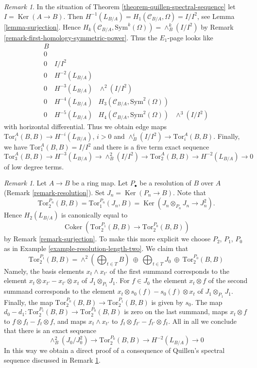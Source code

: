 \documentclass[10pt,a4paper]{article}
\theoremstyle{plain}
\theoremstyle{definition}
\theoremstyle{remark}
\newtheorem{remark}[subsection]{Remark}
\numberwithin{equation}{subsection}
\def\Ker{\mathop{\mathrm{Ker}}}
\def\Coker{\mathop{\mathrm{Coker}}}
\begin{document}
\begin{remark}
\label{remark-elucidate-ss}
In the situation of Theorem \ref{theorem-quillen-spectral-sequence}
let $I = \Ker(A \to B)$. Then
$H^{-1}(L_{B/A}) = H_1(\mathcal{C}_{B/A}, \Omega) = I/I^2$, see
Lemma \ref{lemma-surjection}.
Hence $H_k(\mathcal{C}_{B/A}, \text{Sym}^k(\Omega)) = \wedge^k_B(I/I^2)$ by
Remark \ref{remark-first-homology-symmetric-power}. Thus the
$E_1$-page looks like
$$
\begin{matrix}
B \\
0 \\
0 & I/I^2 \\
0 & H^{-2}(L_{B/A}) \\
0 & H^{-3}(L_{B/A}) & \wedge^2(I/I^2) \\
0 & H^{-4}(L_{B/A}) & H_3(\mathcal{C}_{B/A}, \text{Sym}^2(\Omega)) \\
0 & H^{-5}(L_{B/A}) & H_4(\mathcal{C}_{B/A}, \text{Sym}^2(\Omega)) &
\wedge^3(I/I^2)
\end{matrix}
$$
with horizontal differential. Thus we obtain edge maps
$\text{Tor}_i^A(B, B) \to H^{-i}(L_{B/A})$, $i > 0$ and
$\wedge^i_B(I/I^2) \to \text{Tor}_i^A(B, B)$. Finally, we have
$\text{Tor}_1^A(B, B) = I/I^2$ and there is a
five term exact sequence
$$
\text{Tor}_3^A(B, B) \to H^{-3}(L_{B/A}) \to \wedge^2_B(I/I^2) \to
\text{Tor}_2^A(B, B) \to H^{-2}(L_{B/A}) \to 0
$$
of low degree terms.
\end{remark}

\begin{remark}
\label{remark-elucidate-degree-two}
Let $A \to B$ be a ring map. Let $P_\bullet$ be a resolution of
$B$ over $A$ (Remark \ref{remark-resolution}).
Set $J_n = \Ker(P_n \to B)$. Note that
$$
\text{Tor}_2^{P_n}(B, B) = 
\text{Tor}_1^{P_n}(J_n, B) =
\Ker(J_n \otimes_{P_n} J_n \to J_n^2).
$$
Hence $H_2(L_{B/A})$ is canonically equal to
$$
\Coker(\text{Tor}_2^{P_1}(B, B) \to \text{Tor}_2^{P_0}(B, B))
$$
by Remark \ref{remark-surjection}. To make this more explicit we choose
$P_2$, $P_1$, $P_0$ as in Example \ref{example-resolution-length-two}.
We claim that
$$
\text{Tor}_2^{P_1}(B, B) =
\wedge^2(\bigoplus\nolimits_{t \in T} B)\ \oplus
\ \bigoplus\nolimits_{t \in T} J_0\ \oplus
\ \text{Tor}_2^{P_0}(B, B)
$$
Namely, the basis elements $x_t \wedge x_{t'}$ of the first summand
corresponds to the element $x_t \otimes x_{t'} - x_{t'} \otimes x_t$
of $J_1 \otimes_{P_1} J_1$. For $f \in J_0$ the element $x_t \otimes f$
of the second summand corresponds to the element
$x_t \otimes s_0(f) - s_0(f) \otimes x_t$ of $J_1 \otimes_{P_1} J_1$.
Finally, the map $\text{Tor}_2^{P_0}(B, B) \to \text{Tor}_2^{P_1}(B, B)$
is given by $s_0$. The map
$d_0 - d_1 : \text{Tor}_2^{P_1}(B, B) \to \text{Tor}_2^{P_0}(B, B)$
is zero on the last summand, maps $x_t \otimes f$ to
$f \otimes f_t - f_t \otimes f$, and maps $x_t \wedge x_{t'}$
to $f_t \otimes f_{t'} - f_{t'} \otimes f_t$. All in all we conclude
that there is an exact sequence
$$
\wedge^2_B(J_0/J_0^2) \to \text{Tor}_2^{P_0}(B, B) \to H^{-2}(L_{B/A}) \to 0
$$
In this way we obtain a direct proof of a consequence of Quillen's spectral
sequence discussed in Remark \ref{remark-elucidate-ss}.
\end{remark}
\end{document}
